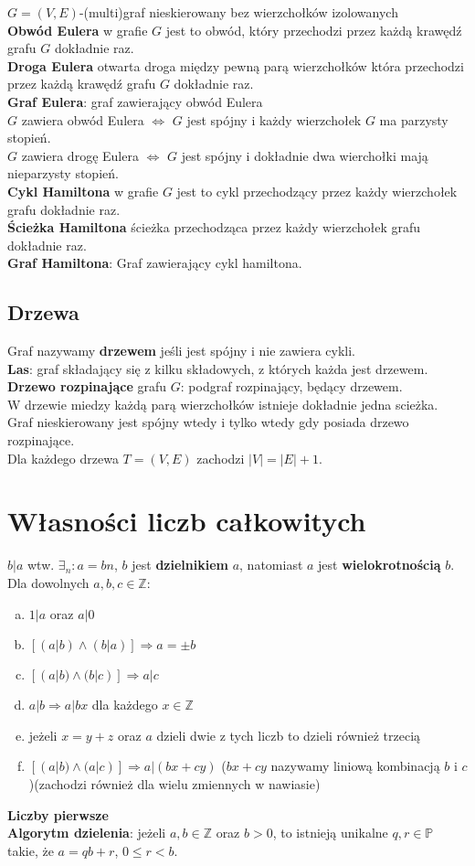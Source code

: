 \documentclass[a4paper,12pt]{article}
\begin{document}
$G=(V,E)$-(multi)graf nieskierowany bez wierzchołków izolowanych\\
\textbf{Obwód Eulera} w grafie $G$ jest to obwód, który przechodzi przez każdą krawędź grafu $G$ dokładnie raz.\\
\textbf{Droga Eulera} otwarta droga między pewną parą wierzchołków która przechodzi przez każdą krawędź grafu $G$ dokładnie raz.\\
\textbf{Graf Eulera}: graf zawierający obwód Eulera\\
$G$ zawiera obwód Eulera $\Leftrightarrow$ $G$ jest spójny i każdy wierzchołek $G$ ma parzysty stopień. \\
$G$ zawiera drogę Eulera $\Leftrightarrow$ $G$ jest spójny i dokładnie dwa wierchołki mają nieparzysty stopień. \\
\textbf{Cykl Hamiltona} w grafie $G$ jest to cykl przechodzący przez każdy wierzchołek grafu dokładnie raz.\\
\textbf{Ścieżka Hamiltona} ścieżka przechodząca przez każdy wierzchołek grafu dokładnie raz.\\
\textbf{Graf Hamiltona}: Graf zawierający cykl hamiltona.
\subsection{Drzewa}
Graf nazywamy \textbf{drzewem} jeśli jest spójny i nie zawiera cykli.\\
\textbf{Las}: graf składający się z kilku składowych, z których każda jest drzewem.\\
\textbf{Drzewo rozpinające} grafu $G$: podgraf rozpinający, będący drzewem.\\
W drzewie miedzy każdą parą wierzchołków istnieje dokładnie jedna scieżka.\\
Graf nieskierowany jest spójny wtedy i tylko wtedy gdy posiada drzewo rozpinające.\\
Dla każdego drzewa $T=(V,E)$ zachodzi $|V|=|E|+1$.
\section{Własności liczb całkowitych}
$b|a$ wtw. $\exists_n:a=bn$, $b$ jest \textbf{dzielnikiem} $a$, natomiast $a$ jest \textbf{wielokrotnością} $b$.\\
Dla dowolnych $a,b,c\in \mathbb{Z}$:
	\begin{enumerate}[a)]
		\item $1|a$ oraz $a|0$
		\item $[(a|b)\wedge(b|a)]\Rightarrow a=\pm b$
		\item $[(a|b)\wedge(b|c)]\Rightarrow a|c$
		\item $a|b \Rightarrow a|bx$ dla każdego $x\in\mathbb{Z}$
		\item jeżeli $x=y+z$ oraz $a$ dzieli dwie z tych liczb to dzieli również trzecią
		\item $[(a|b)\wedge(a|c)]\Rightarrow a|(bx+cy)$ ($bx+cy$ nazywamy liniową kombinacją $b$ i $c$)(zachodzi również dla wielu zmiennych w nawiasie)
	\end{enumerate}
\textbf{Liczby pierwsze}\\
\textbf{Algorytm dzielenia}: jeżeli $a, b \in \mathbb{Z}$ oraz $b>0$, to istnieją unikalne $q,r\in\mathbb{P}$ takie, że $a=qb+r$, $0\leq r <b$.
\end{document}

